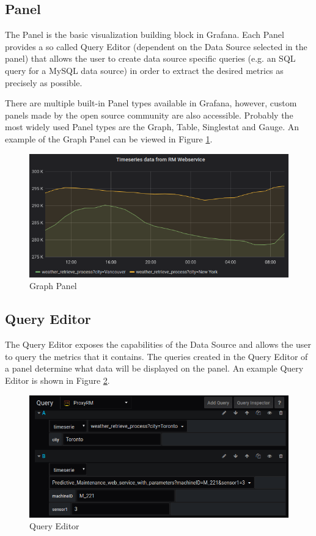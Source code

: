 \subsection{Panel}

The Panel is the basic visualization building block in Grafana. Each Panel provides a so called Query Editor (dependent on the Data Source selected in the panel) that allows the user to create data source specific queries (e.g. an SQL query for a MySQL data source) in order to extract the desired metrics as precisely as possible.

There are multiple built-in Panel types available in Grafana, however, custom panels made by the open source community are also accessible. Probably the most widely used Panel types are the Graph, Table, Singlestat and Gauge. An example of the Graph Panel can be viewed in Figure \ref{fig:graph-panel}.

\begin{figure}[h]
	\centering
	\includegraphics[width=130mm, keepaspectratio]{figures/graph-panel-medium.png}
	\caption{Graph Panel}
	\label{fig:graph-panel}
\end{figure}

\subsection{Query Editor}

The Query Editor exposes the capabilities of the Data Source and allows the user to query the metrics that it contains. The queries created in the Query Editor of a panel determine what data will be displayed on the panel. An example Query Editor is shown in Figure \ref{fig:query-editor}.

\begin{figure}[H]
	\centering
	\includegraphics[width=130mm, keepaspectratio]{figures/query-editor.png}
	\caption{Query Editor}
	\label{fig:query-editor}
\end{figure}


